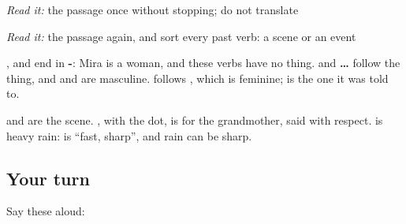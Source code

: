 \begin{tcolorbox}[breakable,skin=enhanced,colback=orange!6,colframe=orange!45!black,boxrule=0.5pt,arc=1mm,left=6pt,right=6pt,top=4pt,bottom=4pt,fonttitle=\bfseries,title={Read this}]
\begin{quote}
                                                                                        
\end{quote}

\emph{Read it:} the passage once without stopping; do not translate

\emph{Read it:} the passage again, and sort every past verb: a scene or an event
\end{tcolorbox}

\begin{culture}
\textbf{}, \textbf{} and \textbf{} end in \textbf{-}: Mira is a woman, and these verbs have no thing. \textbf{  } and \textbf{ …  } follow the thing, and \textbf{} and \textbf{} are masculine. \textbf{     } follows \textbf{}, which is feminine; \textbf{} is the one it was told to.

\textbf{  } and \textbf{  } are the scene. \textbf{}, with the dot, is for the grandmother, said with respect. \textbf{ } is heavy rain: \textbf{} is \textquotedblleft{}fast, sharp\textquotedblright{}, and rain can be sharp.
\end{culture}

\subsection*{Your turn}
Say these aloud:


